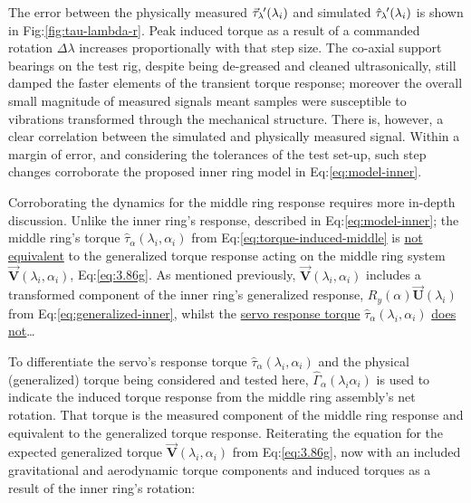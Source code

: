 \par
The error between the physically measured $\vec{\tau}_\lambda\hspace{-1pt}'(\lambda_i)$ and simulated $\hat{\tau}_\lambda\hspace{-1pt}'(\lambda_i)$ is shown in Fig:\ref{fig:tau-lambda-r}.  Peak induced torque as a result of a commanded rotation $\Delta\lambda$ increases proportionally with that step size. The co-axial support bearings on the test rig, despite being de-greased and cleaned ultrasonically, still damped the faster elements of the transient torque response; moreover the overall small magnitude of measured signals meant samples were susceptible to vibrations transformed through the mechanical structure. There is, however, a clear correlation between the simulated and physically measured signal. Within a margin of error, and considering the tolerances of the test set-up, such step changes corroborate the proposed inner ring model in Eq:\ref{eq:model-inner}.
\par
Corroborating the dynamics for the middle ring response requires more in-depth discussion. Unlike the inner ring's response, described in Eq:\ref{eq:model-inner}; the middle ring's torque $\hat{\tau}_\alpha(\lambda_i,\alpha_i)$ from Eq:\ref{eq:torque-induced-middle} is \underline{not equivalent} to the generalized torque response acting on the middle ring system $\vec{\mathbf{V}}(\lambda_i,\alpha_i)$, Eq:\ref{eq:3.86g}. As mentioned previously, $\vec{\mathbf{V}}(\lambda_i,\alpha_i)$ includes a transformed component of the inner ring's generalized response, $R_y(\alpha)\vec{\mathbf{U}}(\lambda_i)$ from Eq:\ref{eq:generalized-inner}, whilst the \underline{servo response torque} $\hat{\tau}_\alpha(\lambda_i,\alpha_i)$ \underline{does not}\ldots 
\par
To differentiate the servo's response torque $\hat{\tau}_\alpha(\lambda_i,\alpha_i)$ and the physical (generalized) torque being considered and tested here, $\hat{\Gamma}_\alpha(\lambda_i\alpha_i)$ is used to indicate the induced torque response from the middle ring assembly's net rotation. That torque is the measured component of the middle ring response and equivalent to the generalized torque response. Reiterating the equation for the expected generalized torque $\vec{\mathbf{V}}(\lambda_i,\alpha_i)$ from Eq:\ref{eq:3.86g}, now with an included gravitational and aerodynamic torque components and induced torques as a result of the inner ring's rotation:
